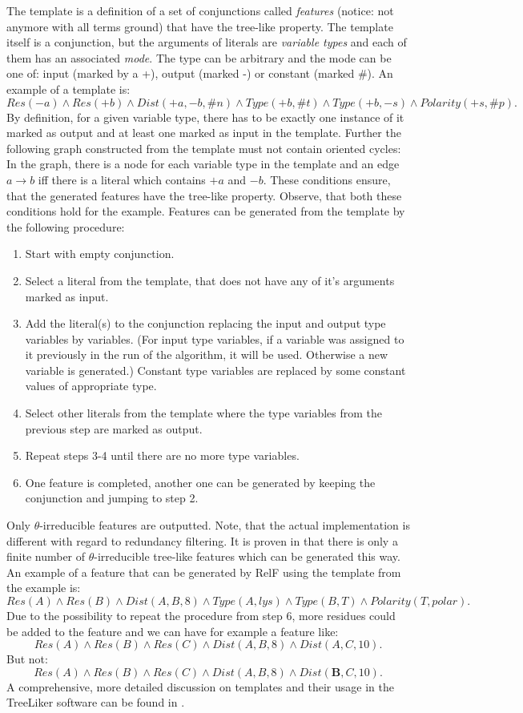 \documentclass[11pt,twoside,a4paper]{book}
\begin{document}
The template is a definition of a set of conjunctions called \emph{features}
(notice: not anymore with all terms ground)
that have the tree-like property. 
The template itself is a conjunction,
but the arguments of literals are \emph{variable types} and each of them has an associated \emph{mode}.
The type can be arbitrary and the mode can be one of:
input (marked by a +), output (marked -) or constant (marked \#).
An example of a template is:
\[ Res(-a)\land Res(+b)\land Dist(+a, -b, \#n)\land Type(+b, \#t)\land Type(+b, -s)\land Polarity(+s, \#p). \]
By definition, for a given variable type, there has to be exactly one instance of it 
marked as output and at least one marked as input in the template.
Further the following graph constructed from the template must not contain oriented cycles: 
In the graph, there is a node for each variable type in the template and an edge $a \rightarrow b$
iff there is a literal which contains $+a$ and $-b$.
These conditions ensure,
that the generated features have the tree-like property.
Observe, that both these conditions hold for the example.
Features can be generated from the template by the following procedure:
\begin{enumerate}
 \item Start with empty conjunction.
 \item Select a literal from the template, that does not have any of it's arguments marked as input.
 \item Add the literal(s) to the conjunction replacing the input and output type variables by variables.
       (For input type variables, if a variable was assigned to it previously in the run of the algorithm,
       it will be used. Otherwise a new variable is generated.)
       Constant type variables are replaced by some constant values of appropriate type.
 \item Select other literals from the template where the type variables from the previous step are marked as output.
 \item Repeat steps 3-4 until there are no more type variables.
 \item One feature is completed, another one can be generated by keeping the conjunction and jumping to step 2.
\end{enumerate}
Only $\theta$-irreducible features are outputted. 
Note, that the actual implementation is different with regard to redundancy filtering. 
It is proven in \cite{relf} that there is only a finite number of $\theta$-irreducible tree-like features
which can be generated this way.
An example of a feature that can be generated by RelF using the template from the example is:
\[ Res(A) \land Res(B)\land Dist(A,B,8)\land Type(A, lys)\land Type(B, T)\land Polarity(T, polar). \]
Due to the possibility to repeat the procedure from step 6,
more residues could be added to the feature and we can have for example a feature like:
\[ Res(A)\land Res(B)\land Res(C)\land Dist(A,B,8)\land Dist(A,C,10). \]
But not:
\[ Res(A)\land Res(B)\land Res(C)\land Dist(A,B,8)\land Dist(\mathbf{B},C,10). \]
A comprehensive, more detailed discussion on templates and their usage in the TreeLiker software
can be found in \cite{szabova}.
\end{document}

